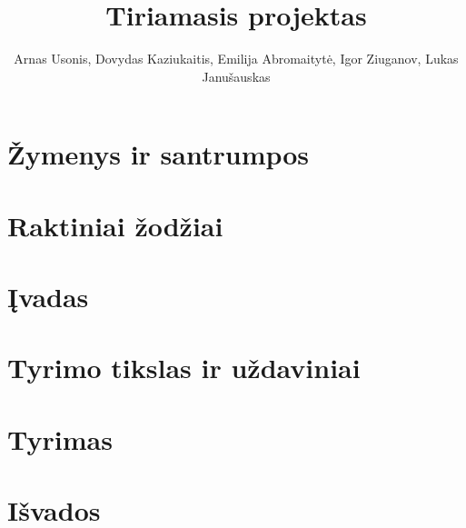 \documentclass{article}
\title{Tiriamasis projektas}
\author{Arnas Usonis, Dovydas Kaziukaitis, Emilija Abromaitytė, Igor Ziuganov, Lukas Janušauskas}
\date{ }
\begin{document}
\maketitle

\section{Žymenys ir santrumpos}


\section{Raktiniai žodžiai}


\section{Įvadas}


\section{Tyrimo tikslas ir uždaviniai}


\section{Tyrimas}


\section{Išvados}

\end{document}
